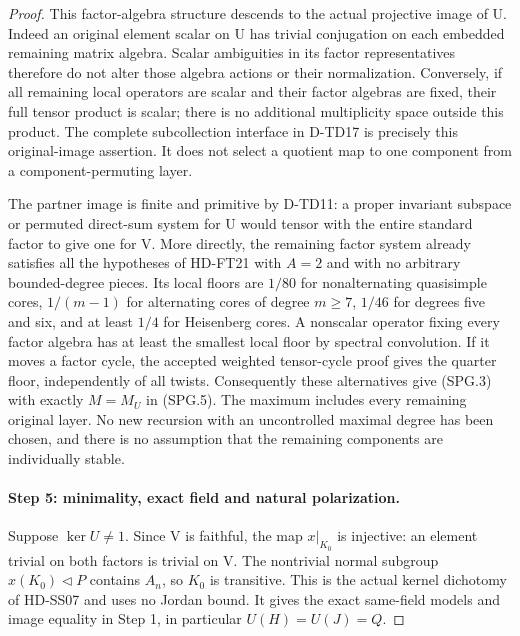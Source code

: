 \begin{proof}
This factor-algebra structure descends to the actual projective
image of U.  Indeed an original element scalar on U has trivial
conjugation on each embedded remaining matrix algebra.  Scalar
ambiguities in its factor representatives therefore do not alter
those algebra actions or their normalization.  Conversely, if
all remaining local operators are scalar and their factor algebras
are fixed, their full tensor product is scalar; there is no
additional multiplicity space outside this product.
The complete subcollection interface in D-TD17 is precisely this
original-image assertion.  It does not select a quotient map to
one component from a component-permuting layer.

The partner image is finite and primitive by D-TD11: a proper
invariant subspace or permuted direct-sum system for U would tensor
with the entire standard factor to give one for V.  More directly,
the remaining factor system already satisfies all the hypotheses
of HD-FT21 with \(A=2\) and with no arbitrary bounded-degree pieces.
Its local floors are \(1/80\) for nonalternating quasisimple cores,
\(1/(m-1)\) for alternating cores of degree \(m\ge7\),
\(1/46\) for degrees five and six, and at least \(1/4\)
for Heisenberg cores.  A nonscalar operator fixing every factor
algebra has at least the smallest local floor by spectral convolution.
If it moves a factor cycle, the accepted weighted tensor-cycle proof
gives the quarter floor, independently of all twists.  Consequently
these alternatives give (SPG.3) with exactly \(M=M_U\) in (SPG.5).
The maximum includes every remaining original layer.  No new recursion
with an uncontrolled maximal degree has been chosen, and there is
no assumption that the remaining components are individually stable.

\paragraph{Step 5: minimality, exact field and natural polarization.}
Suppose \(\ker U\ne1\).  Since V is faithful, the map
\(x|_{K_0}\) is injective: an element trivial on both
factors is trivial on V.  The nontrivial normal subgroup
\(x(K_0)\lhd P\) contains \(A_n\), so \(K_0\) is transitive.
This is the actual kernel dichotomy of HD-SS07 and uses no Jordan
bound.  It gives the exact same-field models and image equality in
Step 1, in particular \(U(H)=U(J)=Q\).


\end{proof}
